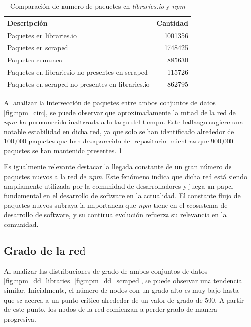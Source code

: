 \begin{table}[ht!]
    \centering
    \begin{tabular}{|l|r|}
        \hline
        \textbf{Descripción}                             & \textbf{Cantidad} \\
        \hline
        Paquetes en libraries.io                         & 1001356           \\
        Paquetes en scraped                              & 1748425           \\
        Paquetes comunes                                 & 885630            \\
        Paquetes en librariesio no presentes en scraped  & 115726            \\
        Paquetes en scraped no presentes en libraries.io & 862795            \\
        \hline
    \end{tabular}
    \caption{Comparación de numero de paquetes en \textit{libraries.io} y \textit{npm}}
    \label{tab:npm_table}
\end{table}

Al analizar la intersección de paquetes entre ambos conjuntos de datos \ref{fig:npm_circ}, se puede observar que
aproximadamente la mitad de la red de \textit{npm} ha permanecido inalterada a lo largo del tiempo.
Este hallazgo sugiere una notable estabilidad en dicha red, ya que solo se han identificado
alrededor de 100,000 paquetes que han desaparecido del repositorio, mientras que 900,000 paquetes
se han mantenido presentes. \ref{tab:npm_table}



Es igualmente relevante destacar la llegada constante de un gran número de paquetes nuevos a la
red de \textit{npm}. Este fenómeno indica que dicha red está siendo ampliamente utilizada por la
comunidad de desarrolladores y juega un papel fundamental en el desarrollo de software en la
actualidad. El constante flujo de paquetes nuevos subraya la importancia que \textit{npm} tiene
en el ecosistema de desarrollo de software, y su continua evolución refuerza su relevancia en la
comunidad.

\subsection{Grado de la red}

Al analizar las distribuciones de grado de ambos conjuntos de datos \ref{fig:npm_dd_libraries} \ref{fig:npm_dd_scraped},
se puede observar una tendencia similar.
Inicialmente, el número de nodos con un grado alto es muy bajo hasta que se acerca a un punto crítico
alrededor de un valor de grado de 500. A partir de este punto, los nodos de la red comienzan a perder
grado de manera progresiva.

